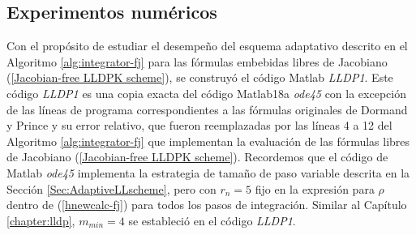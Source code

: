 \subsection{Experimentos numéricos}
Con el propósito de estudiar el desempeño del esquema adaptativo descrito en el Algoritmo \ref{alg:integrator-fj} para las fórmulas embebidas libres de Jacobiano (\ref{Jacobian-free LLDPK scheme}), se construyó el código Matlab \emph{LLDP1}. Este código \emph{LLDP1} es una copia exacta del código Matlab18a \emph{ode45} \cite{shampine1997matlab} con la excepción de las líneas de programa correspondientes a las fórmulas originales de Dormand y Prince y su error relativo, que fueron reemplazadas por las líneas 4 a 12 del Algoritmo \ref{alg:integrator-fj} que implementan la evaluación de las fórmulas libres de Jacobiano (\ref{Jacobian-free LLDPK scheme}). Recordemos que el código de Matlab \emph{ode45} implementa la estrategia de tamaño de paso variable descrita en la Sección \ref{Sec:AdaptiveLLscheme}, pero con $r_n=5$ fijo en la expresión para $\rho$ dentro de (\ref{hnewcalc-fj}) para todos los pasos de integración. Similar al Capítulo \ref{chapter:lldp}, $m_{min}=4$ se estableció en el código \emph{LLDP1}.

